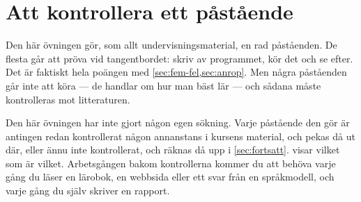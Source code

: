 
\chapter{Att kontrollera ett påstående}
\label{app:verifiera-ovning-upprepningar}

Den här övningen gör, som allt undervisningsmaterial, en rad påståenden.
De flesta går att pröva vid tangentbordet: skriv av programmet, kör det
och se efter.  Det är faktiskt hela poängen med
\cref{sec:fem-fel,sec:anrop}.  Men några påståenden går inte att köra ---
de handlar om hur man bäst lär  --- och sådana måste kontrolleras mot litteraturen.

Den här övningen har inte gjort någon egen sökning.  Varje påstående den
gör är antingen redan kontrollerat någon annanstans i kursens material,
och pekas då ut där, eller ännu inte kontrollerat, och räknas då upp i
\cref{sec:fortsatt}.   visar vilket
som är vilket.
Arbetsgången bakom kontrollerna kommer du att behöva varje gång du läser
en lärobok, en webbsida eller ett svar från en språkmodell, och varje
gång du själv skriver en rapport.

